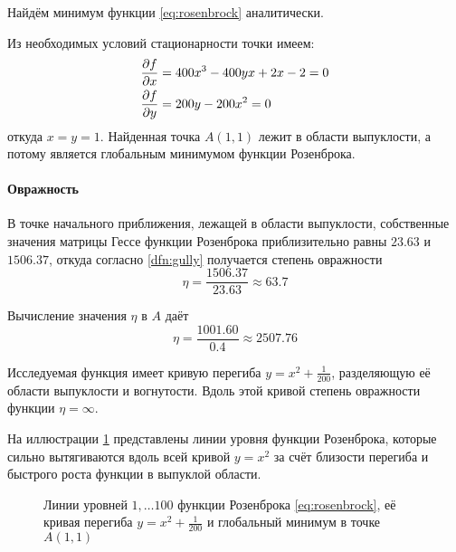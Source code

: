 Найдём минимум функции \eqref{eq:rosenbrock} аналитически.

Из необходимых условий стационарности точки имеем:
\begin{align*}
  \frac{\partial{f}}{\partial{x}} &= 400x^3-400yx+2x-2 = 0 \\
  \frac{\partial{f}}{\partial{y}} &= 200y-200x^2 = 0
\end{align*}
откуда $x = y = 1$. Найденная точка $A(1, 1)$ лежит в области
выпуклости, а потому является глобальным минимумом функции Розенброка.

\paragraph{Овражность}

В точке начального приближения, лежащей в области выпуклости,
собственные значения матрицы Гессе функции Розенброка приблизительно
равны $23.63$ и $1506.37$, откуда согласно \eqref{dfn:gully}
получается степень овражности
\begin{equation}
  \label{eq:rosenbrock-gully-start}
  \eta = \frac{1506.37}{23.63} \approx 63.7
\end{equation}

Вычисление значения $\eta$ в $A$ даёт
\begin{equation}
  \label{eq:rosenbrock-gully-extr}
  \eta = \frac{1001.60}{0.4} \approx 2507.76
\end{equation}

Исследуемая функция имеет кривую перегиба $y=x^2+\frac{1}{200}$,
разделяющую её области выпуклости и вогнутости. Вдоль этой кривой
степень овражности функции $\eta = \infty$.

На иллюстрации \ref{fig:rosenbrock-contours} представлены линии уровня
функции Розенброка, которые сильно вытягиваются вдоль всей кривой
$y=x^2$ за счёт близости перегиба и быстрого роста функции в выпуклой
области.

\begin{figure}[thb]
  \centering
  \caption[Функция Розенброка]{Линии уровней $1, \dotsc 100$ функции
    Розенброка \eqref{eq:rosenbrock}, её кривая перегиба
    $y=x^2+\frac{1}{200}$ и глобальный минимум в точке $A(1, 1)$}
  \label{fig:rosenbrock-contours}
\end{figure}

